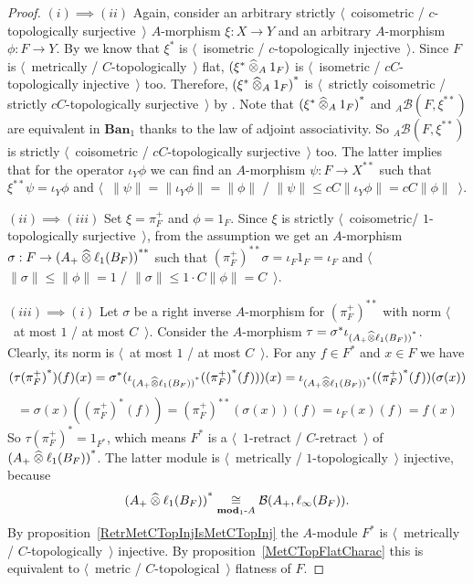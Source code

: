 \begin{proof} $(i)\implies (ii)$ Again, consider an arbitrary strictly 
$\langle$~coisometric / $c$-topologically surjective~$\rangle$ $A$-morphism
$\xi:X\to Y$ and an arbitrary $A$-morphism $\phi:F\to Y$. By
\cite[exercise 4.4.6]{HelLectAndExOnFuncAn} we know that $\xi^*$ is
$\langle$~isometric / $c$-topologically injective~$\rangle$. Since $F$ is
$\langle$~metrically / $C$-topologically~$\rangle$ flat,
$(\xi^*\mathbin{\widehat{\otimes}}_{A}1_F)$ is $\langle$~isometric / $cC$-topologically
injective~$\rangle$ too. Therefore, ${(\xi^*\mathbin{\widehat{\otimes}}_{A}1_F)}^*$ is
$\langle$~strictly coisometric / strictly $cC$-topologically
surjective~$\rangle$ by \cite[exercise 4.4.7]{HelLectAndExOnFuncAn}. Note that
${(\xi^*\mathbin{\widehat{\otimes}}_{A}1_F)}^*$ and ${}_A\mathcal{B}(F,\xi^{**})$ are equivalent
in $\mathbf{Ban}_1$ thanks to the law of adjoint associativity. So
${}_A\mathcal{B}(F,\xi^{**})$ is strictly $\langle$~coisometric / 
$cC$-topologically surjective~$\rangle$ too. The latter implies that for the
operator $\iota_Y\phi$ we can find an $A$-morphism $\psi:F\to X^{**}$ such that
$\xi^{**}\psi=\iota_Y\phi$ and
$\langle$~$\lVert\psi\rVert=\lVert\iota_Y\phi\rVert=\lVert\phi\rVert$ /
$\lVert\psi\rVert\leq cC\lVert\iota_Y\phi\rVert=cC\lVert\phi\rVert$~$\rangle$.

$(ii)\implies (iii)$ Set $\xi=\pi_F^+$ and $\phi=1_F$. Since $\xi$ is
strictly $\langle$~coisometric/ $1$-topologically surjective~$\rangle$,
from the assumption we get an $A$-morphism $\sigma:F\to
{(A_+\mathbin{\widehat{\otimes}}\ell_1(B_F))}^{**}$ such that 
${(\pi_F^+)}^{**}\sigma
=\iota_F 1_F
=\iota_F$ 
and $\langle$~$\lVert\sigma\rVert\leq \lVert\phi\rVert=1$ /
$\lVert\sigma\rVert\leq 1\cdot C\lVert\phi\rVert=C$~$\rangle$.

$(iii)\implies (i)$ Let $\sigma$ be a right inverse $A$-morphism for
${(\pi_F^+)}^{**}$ with norm $\langle$~at most $1$ / at most $C$~$\rangle$.
Consider the $A$-morphism $\tau=\sigma^*\iota_{{(A_+\mathbin{\widehat{\otimes}}\ell_1(B_F))}^*}$.
Clearly, its norm is $\langle$~at most $1$ / at most $C$~$\rangle$. For any
$f\in F^*$ and $x\in F$ we have
\[
(\tau{(\pi_F^+)}^*)(f)(x)
=\sigma^*(\iota_{{(A_+\mathbin{\widehat{\otimes}}\ell_1(B_F))}^*}({(\pi_F^+)}^*(f)))(x)
=\iota_{{(A_+\mathbin{\widehat{\otimes}}\ell_1(B_F))}^*}({(\pi_F^+)}^*(f))(\sigma(x))
\]
\[
=\sigma(x)({(\pi_F^+)}^*(f))
={(\pi_F^+)}^{**}(\sigma(x))(f)
=\iota_F(x)(f)
=f(x)
\]
So $\tau{(\pi_F^+)}^*=1_{F^*}$, which means $F^*$ is a 
$\langle$~$1$-retract / $C$-retract~$\rangle$ of
${(A_+\mathbin{\widehat{\otimes}}\ell_1(B_F))}^*$. The latter module is $\langle$~metrically /
$1$-topologically~$\rangle$ injective, because 
\[
{(A_+\mathbin{\widehat{\otimes}}\ell_1(B_F))}^*
\mathrel{\mathop{\cong}\limits_{\mathbf{mod}_1\text{-}A}}
\mathcal{B}(A_+,\ell_\infty(B_F)).
\] 
By proposition~\ref{RetrMetCTopInjIsMetCTopInj} the $A$-module $F^*$ is
$\langle$~metrically / $C$-topologically~$\rangle$ injective. By 
proposition~\ref{MetCTopFlatCharac} this is
equivalent to $\langle$~metric / $C$-topological~$\rangle$ flatness of $F$.
\end{proof}

